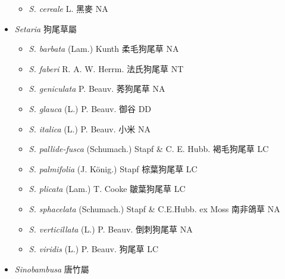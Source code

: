 \begin{itemize}
  \begin{itemize}
        \item[] \textit{S. cereale} L.  黑麥   NA
  \end{itemize}
 \item[] \textit{Setaria} 狗尾草屬
                                
  \begin{itemize}
        \item[] \textit{S. barbata} (Lam.) Kunth  柔毛狗尾草   NA
        \item[] \textit{S. faberi} R. A. W. Herrm.  法氏狗尾草   NT
        \item[] \textit{S. geniculata} P. Beauv.  莠狗尾草   NA
        \item[] \textit{S. glauca} (L.) P. Beauv.  御谷   DD
        \item[] \textit{S. italica} (L.) P. Beauv.  小米   NA
        \item[] \textit{S. pallide-fusca} (Schumach.) Stapf \& C. E. Hubb.  褐毛狗尾草   LC
        \item[] \textit{S. palmifolia} (J. König.) Stapf  棕葉狗尾草   LC
        \item[] \textit{S. plicata} (Lam.) T. Cooke  皺葉狗尾草   LC
        \item[] \textit{S. sphacelata} (Schumach.) Stapf \& C.E.Hubb. ex Moss  南非鴿草   NA
        \item[] \textit{S. verticillata} (L.) P. Beauv.  倒刺狗尾草   NA
        \item[] \textit{S. viridis} (L.) P. Beauv.  狗尾草   LC
  \end{itemize}
 \item[] \textit{Sinobambusa} 唐竹屬
                                

\end{itemize}
